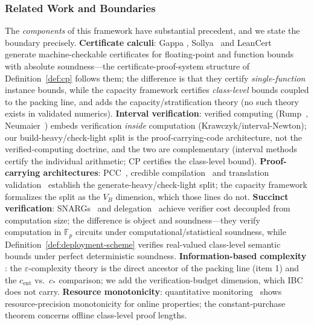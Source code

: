 \vspace{4pt}
\subsubsection{Related Work and Boundaries}
\label{sec:capacity-related}

The \emph{components} of this framework have substantial precedent, and
we state the boundary precisely. \textbf{Certificate calculi}: Gappa
\cite{daumas2009gappa}, Sollya~\cite{chevillard2010sollya} and
LeanCert~\cite{radisic2025leancert} generate machine-checkable
certificates for floating-point and function bounds with absolute
soundness---the certificate-proof-system structure of
Definition~\ref{def:cp} follows them; the difference is that they
certify \emph{single-function} instance bounds, while the capacity
framework certifies \emph{class-level} bounds coupled to the packing
line, and adds the capacity/stratification theory (no such theory
exists in validated numerics). \textbf{Interval verification}:
verified computing (Rump~\cite{rump1999interval},
Neumaier~\cite{neumaier1990interval}) embeds verification \emph{inside}
computation (Krawczyk/interval-Newton); our build-heavy/check-light
split is the proof-carrying-code architecture, not the verified-computing
doctrine, and the two are complementary (interval methods certify the
individual arithmetic; CP certifies the class-level bound).
\textbf{Proof-carrying architectures}: PCC~\cite{necula1998pcc},
credible compilation~\cite{rinard1999credible} and translation
validation~\cite{pnueli1998translation} establish the
generate-heavy/check-light split; the capacity framework formalizes
the split as the $V_B$ dimension, which those lines do not.
\textbf{Succinct verification}: SNARGs~\cite{kalai2023snargs} and
delegation~\cite{goldwasser2008gkr} achieve verifier cost decoupled
from computation size; the difference is object and soundness---they
verify computation in $\mathbb{F}_p$ circuits under
computational/statistical soundness, while
Definition~\ref{def:deployment-scheme} verifies real-valued class-level
semantic bounds under perfect deterministic soundness.
\textbf{Information-based complexity}
\cite{traub1988information}: the $\varepsilon$-complexity theory is
the direct ancestor of the packing line (item 1) and the
$c_{\mathrm{ent}}$ vs.\ $c_*$ comparison; we add the verification-budget
dimension, which IBC does not carry. \textbf{Resource monotonicity}:
quantitative monitoring~\cite{henzinger2021monitor} shows
resource-precision monotonicity for online properties; the
constant-purchase theorem concerns offline class-level proof lengths.
